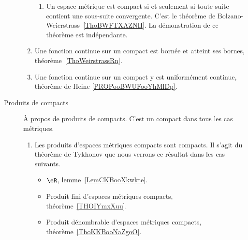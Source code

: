 \begin{description}
\begin{enumerate}
\begin{enumerate}
            \item
                Un espace métrique est compact si et seulement si toute suite contient une sous-suite convergente. C'est le théorème de Bolzano-Weierstrass~\ref{ThoBWFTXAZNH}. La démonstration de ce théorème est indépendante.
        \end{enumerate}
    \item
        Une fonction continue sur un compact est bornée et atteint ses bornes, théorème~\ref{ThoWeirstrassRn}.
    \item
        Une fonction continue sur un compact y est uniformément continue, théorème de Heine \ref{PROPooBWUFooYhMlDp}.
                \end{enumerate}

        \item[Produits de compacts]
            À propos de produits de compacts. C'est un compact dans tous les cas métriques.
    \begin{enumerate}
    \item
        Les produits d'espaces métriques compacts sont compacts. Il s'agit du théorème de Tykhonov que nous verrons ce résultat dans les cas suivants.
        \begin{itemize}
    \item
         \( \eR\), lemme~\ref{LemCKBooXkwkte}.
    \item
        Produit fini d'espaces métriques compacts, théorème~\ref{THOIYmxXuu}.
    \item
        Produit dénombrable d'espaces métriques compacts, théorème~\ref{ThoKKBooNaZgoO}.
        \end{itemize}
    \end{enumerate}
    \end{description}

